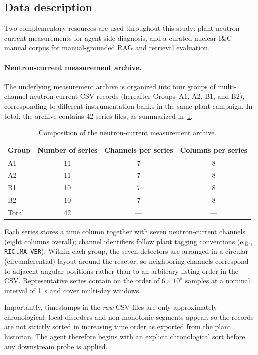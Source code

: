 \subsection{Data description}
\label{sec:data}
Two complementary resources are used throughout this study: plant neutron-current measurements for
agent-side diagnosis, and a curated nuclear I\&C manual corpus for manual-grounded RAG and retrieval
evaluation.

\paragraph{Neutron-current measurement archive.}
The underlying measurement archive is organized into four groups of multi-channel neutron-current CSV
records (hereafter Groups~A1, A2, B1, and B2), corresponding to different instrumentation banks in the
same plant campaign.
In total, the archive contains 42 series files, as summarized in~\cref{tab:neutron-data}.

\begin{table}[H]
  \centering
  \caption{Composition of the neutron-current measurement archive.}
  \label{tab:neutron-data}
  \begin{tabular}{@{}lccc@{}}
    \toprule
    Group & Number of series & Channels per series & Columns per series \\
    \midrule
    A1 & 11 & 7 & 8 \\
    A2 & 11 & 7 & 8 \\
    B1 & 10 & 7 & 8 \\
    B2 & 10 & 7 & 8 \\
    \midrule
    Total & 42 & --- & --- \\
    \bottomrule
  \end{tabular}
\end{table}

Each series stores a time column together with seven neutron-current channels (eight columns overall);
channel identifiers follow plant tagging conventions (e.g., \texttt{RIC}\ldots\texttt{MA\_VER}).
Within each group, the seven detectors are arranged in a circular (circumferential) layout around the
reactor, so neighboring channels correspond to adjacent angular positions rather than to an arbitrary
listing order in the CSV.
Representative series contain on the order of $6\times 10^{5}$ samples at a nominal interval of
\SI{1}{\second} and cover multi-day windows.

Importantly, timestamps in the \emph{raw} CSV files are only approximately chronological: local
disorders and non-monotonic segments appear, so the records are not strictly sorted in increasing time
order as exported from the plant historian.
The agent therefore begins with an explicit chronological sort before any downstream probe is applied.

